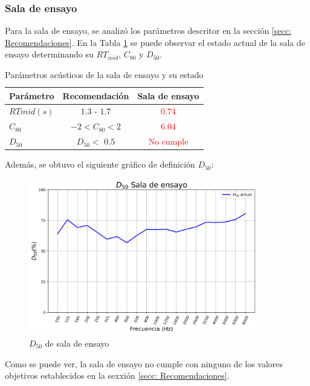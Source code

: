 \subsubsection{Sala de ensayo}
    Para la sala de ensayo, se analizó los parámetros descritor en la sección \ref{secc: Recomendaciones}.
    En la Tabla \ref{tab:parametros acusticos sala ensayo} se puede observar el estado actual de la sala de ensayo determinando su $RT_{mid}$, $C_{80}$ y $D_{50}$.
    \begin{table}[H]
        \centering
        \begin{tabular}{|l|c|c|}
        \hline
        \textbf{Parámetro}& \textbf{Recomendación} & \textbf{Sala de ensayo}\\ \hline
        $RT{mid} (s)$ &  $1.3$ - $1.7$  & \textcolor{red}{$0.74$} \\ \hline
        $C_{80}$      & $-2<C_{80}<2$   & \textcolor{red}{$6.04$} \\\hline
        $D_{50}$      & $D_{50}<$ $0.5$   & \textcolor{red}{No cumple} \\\hline
        \end{tabular}
        \caption{Parámetros acústicos de la sala de ensayo y su estado}
        \label{tab:parametros acusticos sala ensayo}
    \end{table}
    
    Además, se obtuvo el siguiente gráfico de definición $D_{50}$:
    \begin{figure}[H]
        \centering
        \includegraphics[width=10cm]{Imagenes/Resultados/D50_actual.png}
        \caption{$D_{50}$ de sala de ensayo}
    \end{figure}

    Como se puede ver, la sala de ensayo no cumple con ninguno de los valores objetivos establecidos en la sexxión \ref{secc: Recomendaciones}.


